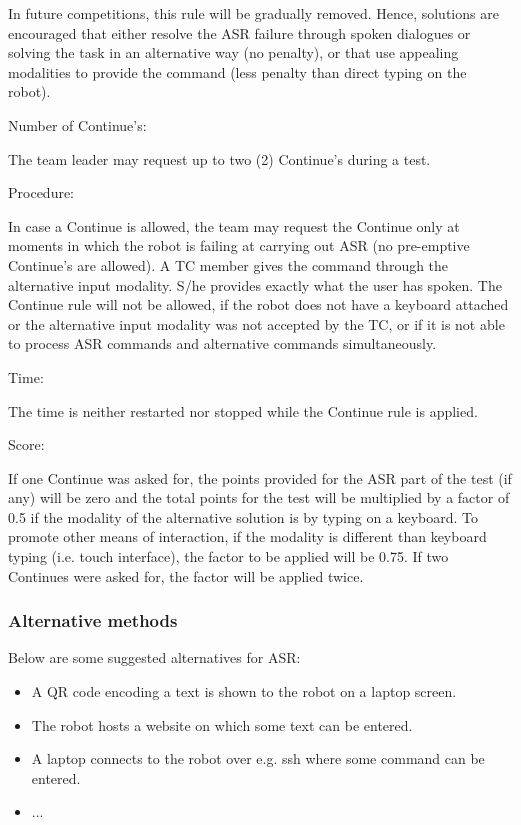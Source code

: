 In future competitions, this rule will be gradually removed. 
Hence, solutions are encouraged that either resolve the ASR failure through spoken dialogues or solving the task in an alternative way (no penalty), or that use appealing modalities to provide the command (less penalty than direct typing on the robot).

\begin{enumerate}
{\bf\item Number of Continue's:} The team leader may request up to two (2) Continue's during a test. 
{\bf\item Procedure:} In case a Continue is allowed, the team may request the Continue only at moments in which the robot is failing at carrying out ASR (no pre-emptive Continue's are allowed).
A TC member gives the command through the alternative input modality. S/he provides exactly what the user has spoken. 
The Continue rule will not be allowed, if the robot does not have a keyboard attached or the alternative input modality was not accepted by the TC, or if it is not able to process ASR commands and alternative commands simultaneously.
{\bf\item Time:} The time is neither restarted nor stopped while the Continue rule is applied.
{\bf\item Score:} If one Continue was asked for, the points provided for the ASR part of the test (if any) will be zero and the total points for the test will be multiplied by a factor of 0.5 if the modality of the alternative solution is by typing on a keyboard. To promote other means of interaction, if the modality is different than keyboard typing (i.e. touch interface), the factor to be applied will be 0.75. If two Continues were asked for, the factor will be applied twice.
\end{enumerate}

\subsubsection{Alternative methods}
Below are some suggested alternatives for ASR:
\begin{itemize}
 \item A QR code encoding a text is shown to the robot on a laptop screen.
 \item The robot hosts a website on which some text can be entered.
 \item A laptop connects to the robot over e.g. ssh where some command can be entered. 
 \item ...
\end{itemize}




